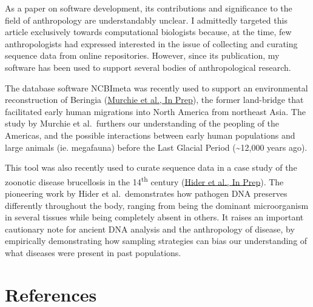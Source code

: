 \documentclass[
]{report}
\begin{document}
As a paper on software development, its contributions and significance
to the field of anthropology are understandably unclear. I admittedly
targeted this article exclusively towards computational biologists
because, at the time, few anthropologists had expressed interested in
the issue of collecting and curating sequence data from online
repositories. However, since its publication, my software has been used
to support several bodies of anthropological research.

The database software NCBImeta was recently used to support an
environmental reconstruction of Beringia
(\protect\hyperlink{ref-murchieInPrepNoBonesIt}{Murchie et al., In
Prep}), the former land-bridge that facilitated early human migrations
into North America from northeast Asia. The study by Murchie et
al.~furthers our understanding of the peopling of the Americas, and the
possible interactions between early human populations and large animals
(ie. megafauna) before the Last Glacial Period (\textasciitilde12,000
years ago).

This tool was also recently used to curate sequence data in a case study
of the zoonotic disease brucellosis in the 14\textsuperscript{th}
century (\protect\hyperlink{ref-hiderInPrepExaminingPathogenDNA}{Hider
et al., In Prep}). The pioneering work by Hider et al.~demonstrates how
pathogen DNA preserves differently throughout the body, ranging from
being the dominant microorganism in several tissues while being
completely absent in others. It raises an important cautionary note for
ancient DNA analysis and the anthropology of disease, by empirically
demonstrating how sampling strategies can bias our understanding of what
diseases were present in past populations.

\hypertarget{bibliography}{%
\chapter*{References}\label{bibliography}}
\end{document}

